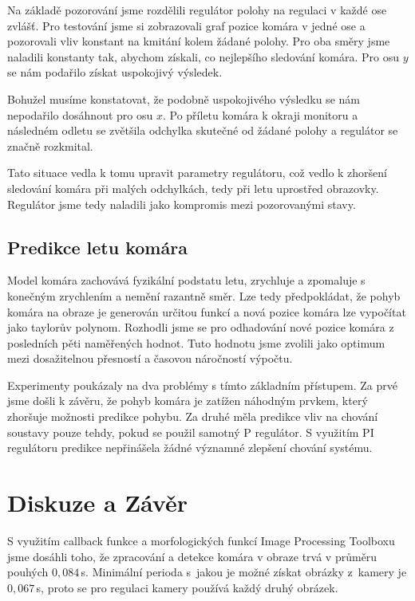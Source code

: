 \documentclass[a4paper,10pt]{article}
\begin{document}
Na základě pozorování jsme rozdělili regulátor polohy na regulaci v každé ose zvlášť.
Pro testování jsme si zobrazovali graf pozice komára v jedné ose a pozorovali vliv konstant na kmitání kolem žádané polohy. 
Pro oba směry jsme naladili konstanty tak, abychom získali, co nejlepšího sledování komára.
Pro osu $y$ se nám podařilo získat uspokojivý výsledek. 

Bohužel musíme konstatovat, že podobně uspokojivého výsledku se nám nepodařilo dosáhnout pro osu $x$. 
Po příletu komára k okraji monitoru a následném odletu se zvětšila odchylka skutečné od žádané polohy 
a regulátor se značně rozkmital. 

Tato situace vedla k tomu upravit parametry regulátoru, což vedlo k zhoršení sledování komára při malých odchylkách, 
tedy při letu uprostřed obrazovky. Regulátor jsme tedy naladili jako kompromis mezi pozorovanými stavy. 

\subsection{Predikce letu komára}

Model komára zachovává fyzikální podstatu letu, zrychluje a zpomaluje s koneč\-ným zrychlením a nemění razantně směr.
Lze tedy předpokládat, že pohyb komára na obraze je generován určitou funkcí a 
nová pozice komára lze vypočítat jako taylorův polynom. 
Rozhodli jsme se pro odhadování nové pozice komára z posledních pěti naměřených hodnot.
Tuto hodnotu jsme zvolili jako optimum mezi dosažitelnou přesností a časovou náročností výpočtu.

Experimenty poukázaly na dva problémy s tímto základním přístupem. 
Za prvé jsme došli k závěru, že pohyb komára je zatížen náhodným prvkem, který zhoršuje možnosti predikce pohybu.
Za druhé měla predikce vliv na chování soustavy pouze tehdy, pokud se použil samotný P regulátor. 
S využitím PI regulátoru predikce nepřinášela žádné významné zlepšení chování systému.


\section{Diskuze a Závěr}

S využitím callback funkce a 
morfologických funkcí Image Processing Toolboxu jsme dosáhli toho, že zpracování a 
detekce komára v obraze trvá v průměru pouhých $0,084$\,s. 
Minimální perioda s~jakou je možné získat obrázky z~kamery je $0,067$\,s,
proto se pro regulaci kamery používá každý druhý obrázek.
\end{document}
